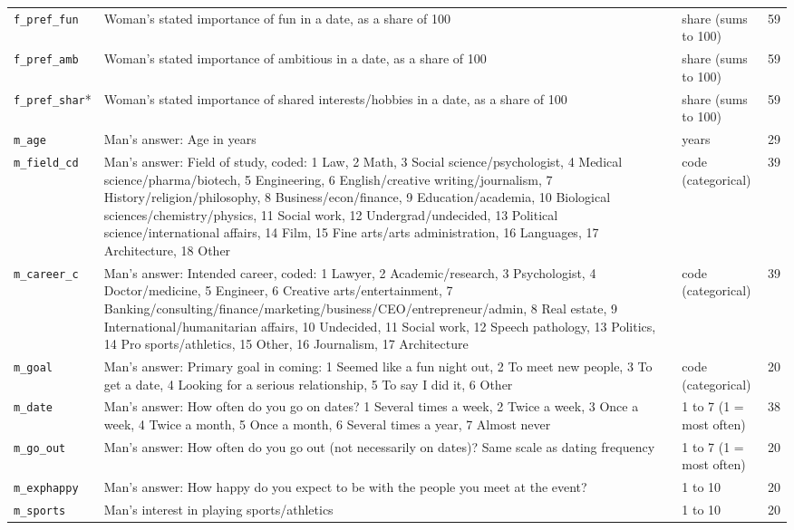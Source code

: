 \documentclass[11pt]{article}
\begin{document}
\begin{longtable}{L{3.3cm}L{8.2cm}L{2.4cm}r}
\texttt{f\_pref\_fun} & Woman's stated importance of fun in a date, as a share of 100 & share (sums to 100) & 59 \\
\texttt{f\_pref\_amb} & Woman's stated importance of ambitious in a date, as a share of 100 & share (sums to 100) & 59 \\
\texttt{f\_pref\_shar}* & Woman's stated importance of shared interests/hobbies in a date, as a share of 100 & share (sums to 100) & 59 \\
\texttt{m\_age} & Man's answer: Age in years & years & 29 \\
\texttt{m\_field\_cd} & Man's answer: Field of study, coded: 1 Law, 2 Math, 3 Social science/psychologist, 4 Medical science/pharma/biotech, 5 Engineering, 6 English/creative writing/journalism, 7 History/religion/philosophy, 8 Business/econ/finance, 9 Education/academia, 10 Biological sciences/chemistry/physics, 11 Social work, 12 Undergrad/undecided, 13 Political science/international affairs, 14 Film, 15 Fine arts/arts administration, 16 Languages, 17 Architecture, 18 Other & code (categorical) & 39 \\
\texttt{m\_career\_c} & Man's answer: Intended career, coded: 1 Lawyer, 2 Academic/research, 3 Psychologist, 4 Doctor/medicine, 5 Engineer, 6 Creative arts/entertainment, 7 Banking/consulting/finance/marketing/business/CEO/entrepreneur/admin, 8 Real estate, 9 International/humanitarian affairs, 10 Undecided, 11 Social work, 12 Speech pathology, 13 Politics, 14 Pro sports/athletics, 15 Other, 16 Journalism, 17 Architecture & code (categorical) & 39 \\
\texttt{m\_goal} & Man's answer: Primary goal in coming: 1 Seemed like a fun night out, 2 To meet new people, 3 To get a date, 4 Looking for a serious relationship, 5 To say I did it, 6 Other & code (categorical) & 20 \\
\texttt{m\_date} & Man's answer: How often do you go on dates? 1 Several times a week, 2 Twice a week, 3 Once a week, 4 Twice a month, 5 Once a month, 6 Several times a year, 7 Almost never & 1 to 7 (1 = most often) & 38 \\
\texttt{m\_go\_out} & Man's answer: How often do you go out (not necessarily on dates)? Same scale as dating frequency & 1 to 7 (1 = most often) & 20 \\
\texttt{m\_exphappy} & Man's answer: How happy do you expect to be with the people you meet at the event? & 1 to 10 & 20 \\
\texttt{m\_sports} & Man's interest in playing sports/athletics & 1 to 10 & 20 \\

\end{longtable}
\end{document}
